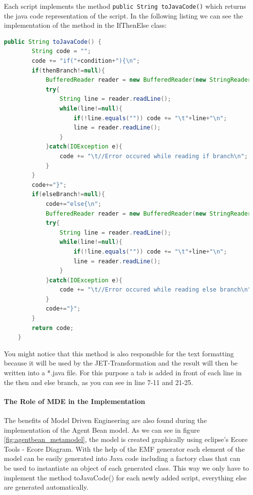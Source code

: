Each script implements the method \verb|public String toJavaCode()| which returns the java code representation of the script.
In the following listing we can see the implementation of the method in the IfThenElse class:
\begin{lstlisting}[language = Java, caption = toJavaCode() Implementation in the IfThenElse Class]
	public String toJavaCode() {
		String code = "";
		code += "if("+condition+"){\n";
		if(thenBranch!=null){
			BufferedReader reader = new BufferedReader(new StringReader(thenBranch.toJavaCode()));
			try{
				String line = reader.readLine();
				while(line!=null){
					if(!line.equals("")) code += "\t"+line+"\n";
					line = reader.readLine();
				}
			}catch(IOException e){
				code += "\t//Error occured while reading if branch\n";
			}
		}
		code+="}";
		if(elseBranch!=null){
			code+="else{\n";
			BufferedReader reader = new BufferedReader(new StringReader(elseBranch.toJavaCode()));
			try{
				String line = reader.readLine();
				while(line!=null){
					if(!line.equals("")) code += "\t"+line+"\n";
					line = reader.readLine();
				}
			}catch(IOException e){
				code += "\t//Error occured while reading else branch\n";
			}
			code+="}";
		}
		return code;
	}
\end{lstlisting}

You might notice that this method is also responsible for the text formatting because it will be used by the JET-Transformation and the result will then be written into a *.java file. For this purpose a tab is added in front of each line in the then and else branch, as you can see in line 7-11 and 21-25.\\\\
\textbf{The Role of MDE in the Implementation}\\\\
The benefits of Model Driven Engineering are also found during the implementation of the Agent Bean model. As we can see in figure \ref{fig:agentbean_metamodel}, the model is created graphically using eclipse's Ecore Tools - Ecore Diagram. With the help of the EMF generator each element of the model can be easily generated into Java code including a factory class that can be used to instantiate an object of each generated class. This way we only have to implement the method toJavaCode() for each newly added script, everything else are generated automatically. 



